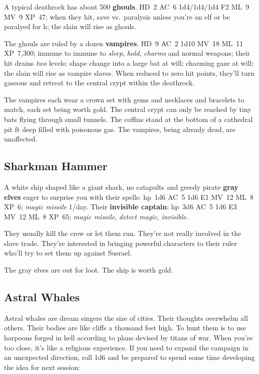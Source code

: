 \documentclass[a4paper,serif]{rpg-module}
\begin{document}
A typical deathrock has about 500 \textbf{ghouls}. HD~2 AC~6
1d4/1d4/1d4 F2 ML~9 MV~9 XP~47; when they hit, save vs.~paralysis
unless you're an elf or be paralyed for \unit[1]{h}; the slain will
rise as ghouls.

The ghouls are ruled by a dozen \textbf{vampires}. HD~9 AC~2 1d10
MV~18 ML~11 XP~7,300; immune to immune to \textit{sleep},
\textit{hold}, \textit{charms} and normal weapons; their hit drains
\emph{two} levels; shape change into a large bat at will; charming
gaze at will; the slain will rise as vampire slaves. When reduced to
zero hit points, they'll turn gaseous and retreat to the central crypt
within the deathrock.

The vampires each wear a crown set with gems and necklaces and
bracelets to match, each set being worth \unit[10,000]{gold}. The
central crypt can only be reached by tiny bats flying through small
tunnels. The coffins stand at the bottom of a cathedral pit
\unit[100]{ft} deep filled with poisonous gas. The vampires, being
already dead, are unaffected.

\subsection{Sharkman Hammer}
\label{sec:sharkman-hammer}

A white ship shaped like a giant shark, no catapults and 
greedy pirate \textbf{gray elves} eager to surprise you with their
spells: hp~1d6 AC~5 1d6 E1 MV~12 ML~8 XP~6; \emph{magic missile}
1/day. Their \textbf{invisible captain}: hp~3d6 AC~5 1d6 E3 MV~12 ML~8
XP~65; \emph{magic missile}, \emph{detect magic}, \emph{invisible}.

They usually kill the crew or let them run. They're not really
involved in the slave trade. They're interested in bringing powerful
characters to their ruler who'll try to set them up against Susrael.

The gray elves are out for loot. The ship is worth
\unit[20,000]{gold}.

\subsection{Astral Whales}
\label{sec:astral-whales}

Astral whales are dream singers the size of cities. Their thoughts
overwhelm all others. Their bodies are like cliffs a thousand feet
high. To hunt them is to use harpoons forged in hell according to
plans devised by titans of war. When you're too close, it's like a
religious experience. If you need to expand the campaign in an
unexpected direction, roll 1d6 and be prepared to spend some time
developing the idea for next session:
\end{document}
